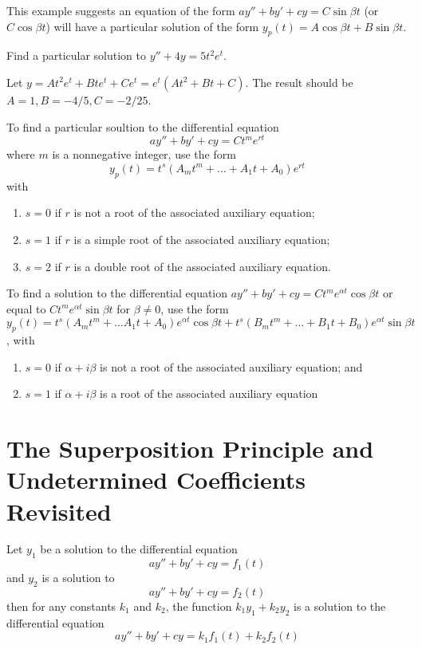 \documentclass[../diffeq.tex]{subfiles}
\begin{document}
This example suggests an equation of the form $ay''+by'+cy=C\sin\beta t$ (or $C\cos\beta t$) will have a particular solution of the form $y_p(t)=A\cos\beta t+B\sin\beta t$.

\begin{example}
    Find a particular solution to $y''+4y=5t^2e^t$.

    Let $y= At^2e^t+Bte^t+Ce^t = e^t(At^2+Bt+C)$. The result should be $A=1,B=-4/5, C=-2/25$.
\end{example}

To find a particular soultion to the differential equation 
\[ ay''+by'+cy=Ct^me^{rt} \]
where $m$ is a nonnegative integer, use the form 
\[ y_p(t)=t^s(A_mt^m+\dots +A_1t+A_0)e^{rt} \]
with 
\begin{enumerate}
    \item $s=0$ if $r$ is not a root of the associated auxiliary equation;
    \item $s=1$ if $r$ is a simple root of the associated auxiliary equation;
    \item $s=2$ if $r$ is a double root of the associated auxiliary equation.
\end{enumerate}

To find a solution to the differential equation $ay''+by'+cy = Ct^me^{\alpha t}\cos \beta t$ or equal to $Ct^me^{\alpha t}\sin\beta t$ for $\beta \neq 0$, use the form $y_p(t)=t^s(A_mt^m+\dots A_1t+A_0)e^{\alpha t}\cos\beta t+t^s(B_mt^m+\dots +B_1t+B_0)e^{\alpha t}\sin\beta t$, with 
\begin{enumerate}
    \item $s=0$ if $\alpha + i\beta$ is not a root of the associated auxiliary equation; and 
    \item $s=1$ if $\alpha + i\beta$ is a root of the associated auxiliary equation
\end{enumerate}

\pagebreak
\section{The Superposition Principle and Undetermined Coefficients Revisited}
\begin{theorem}
    Let $y_1$ be a solution to the differential equation 
    \[ ay''+by'+cy=f_1(t) \]
    and $y_2$ is a solution to 
    \[ ay''+by'+cy=f_2(t) \]
    then for any constants $k_1$ and $k_2$, the function $k_1y_1+k_2y_2$ is a solution to the differential equation 
    \[ ay''+by'+cy = k_1f_1(t)+k_2f_2(t) \]
\end{theorem}
\end{document}
